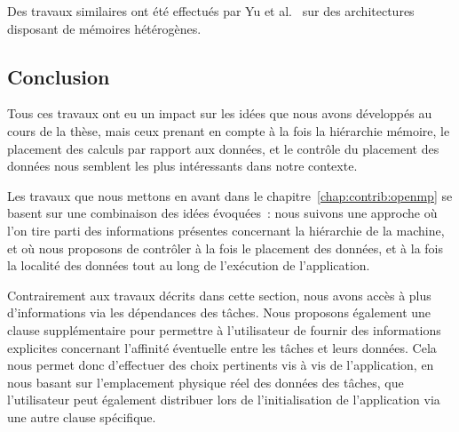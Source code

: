 Des travaux similaires ont été effectués par Yu et al.~\cite{Yu2017} sur des architectures disposant de mémoires hétérogènes.



\subsection*{Conclusion}

Tous ces travaux ont eu un impact sur les idées que nous avons développés au cours de la thèse, mais ceux prenant en compte à la fois la hiérarchie mémoire, le placement des calculs par rapport aux données, et le contrôle du placement des données nous semblent les plus intéressants dans notre contexte.

Les travaux que nous mettons en avant dans le chapitre~\ref{chap:contrib:openmp} se basent sur une combinaison des idées évoquées~: nous suivons une approche où l'on tire parti des informations présentes concernant la hiérarchie de la machine, et où nous proposons de contrôler à la fois le placement des données, et à la fois la localité des données tout au long de l'exécution de l'application.

Contrairement aux travaux décrits dans cette section, nous avons accès à plus d'informations via les dépendances des tâches. Nous proposons également une clause supplémentaire pour permettre à l'utilisateur de fournir des informations explicites concernant l'affinité éventuelle entre les tâches et leurs données.
Cela nous permet donc d'effectuer des choix pertinents vis à vis de l'application, en nous basant sur l'emplacement physique réel des données des tâches, que l'utilisateur peut également distribuer lors de l'initialisation de l'application via une autre clause spécifique.
